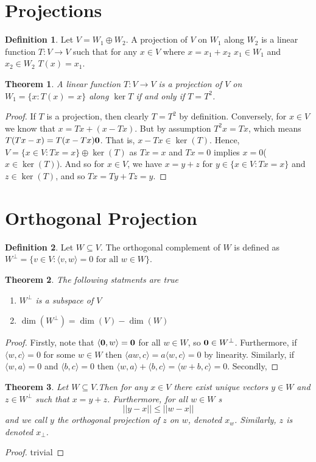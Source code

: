 \documentclass[oneside, 12pt]{book}
\newtheorem{thm}{Theorem}[section]
\theoremstyle{definition}
\newtheorem{defn}{Definition}[section]
\begin{document}
\section{Projections}
\begin{defn}
\label{defn_prj}
Let $V=W_{1}\oplus W_{2}$. A projection of $V$ on $W_{1}$ along $W_{2}$ is a linear function $T:V \to V$ such that for any $x \in V$ where $x=x_{1}+x_{2}$ $x_{1} \in W_{1}$ and $x_{2} \in W_{2}$ $T(x)=x_{1}$.
\end{defn}
\begin{thm}
\label{thm_projiff}
A linear function $T:V \to V$ is a projection of $V$ on $W_{1}=\{x : T(x)=x \}$ along $\ker{T}$ if and only if $T=T^{2}$.
\end{thm}
\begin{proof}
  If $T$ is a projection, then clearly $T=T^{2}$ by definition. Conversely, for $x \in V$ we know that $x=Tx+(x-Tx)$. But by assumption
  $T^{2}x=Tx$, which means $T(Tx-x)=T(x-Tx)\bold{0}$. That is, $x-Tx \in \ker(T)$. Hence, $V=\{x \in V: Tx=x\} \oplus \ker(T)$ as $Tx=x$ and $Tx=0$  implies $x=0$($x \in \ker(T)$). And so for $x \in V$, we have $x=y+z$ for $y \in \{x \in V: Tx=x\}$ and $z\in \ker(T)$, and so $Tx=Ty+Tz=y$.
\end{proof}
\section{Orthogonal Projection}
\begin{defn}
\label{orthcomp}
Let $W \subseteq V$. The orthogonal complement of $W$ is defined as $W^{\perp}=\{v \in V : \langle v, w \rangle=0 \text{ for all } w \in W\}$.
\end{defn}
\begin{thm}
The following statments are true
\begin{enumerate}
  \item $W^{\perp}$ is a subspace of $V$
  \item $\dim(W^{\perp})=\dim(V)-\dim(W)$
\end{enumerate}
\end{thm}
\begin{proof}
  Firstly, note that $ \langle \bold{0}, w\rangle=\bold{0}$ for all $w \in W$, so $\bold{0} \in W^{\perp}$. Furthermore, if $\langle w, c\rangle=0$ for some $w \in W$ then
  $\langle aw, c \rangle = a \langle w, c \rangle =0 $ by linearity. Similarly, if $\langle w, a \rangle=0  $ and $\langle b, c \rangle=0  $ then $\langle w, a \rangle+ \langle b, c \rangle= \langle w+b, c \rangle =0$. Secondly,
\end{proof}
\begin{thm}
\label{thm_orthodecomp}
  Let $W \subseteq V$.Then for any $x \in V$ there exist unique vectors $y \in W$ and $z \in W^{\perp}$ such that $x=y+z$. Furthermore, for all $w \in W$
s  \[ ||y-x|| \leq ||w-x||\] and we call $y$ the orthogonal projection of $z$ on $w$, denoted $x_{w}$. Similarly, $z$ is denoted $x_{\perp}$.
\end{thm}
\begin{proof}
trivial
\end{proof}
\end{document}
